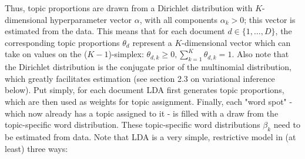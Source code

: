 \documentclass[12pt]{article}
\begin{document}
\noindent
Thus, topic proportions are drawn from a Dirichlet distribution with $K$-dimensional hyperparameter vector $\alpha$, with all components $\alpha_k > 0$; this vector is estimated from the data. This means that for each document $d \in \{1,\dots,D\}$, the corresponding topic proportions $\theta_d$ represent a $K$-dimensional vector which can take on values on the ($K-1$)-simplex: $\theta_{d,k} \geq 0, \sum_{k=1}^{K}\theta_{d,k}=1$. Also note that the Dirichlet distribution is the conjugate prior of the multinomial distribution, which greatly facilitates estimation (see section 2.3 on variational inference below). Put simply, for each document LDA first generates topic proportions, which are then used as weights for topic assignment. Finally, each "word spot" - which now already has a topic assigned to it - is filled with a draw from the topic-specific word distribution. These topic-specific word distributions $\beta_k$ need to be estimated from data.
Note that LDA is a very simple, restrictive model in (at least) three ways:
\end{document}
